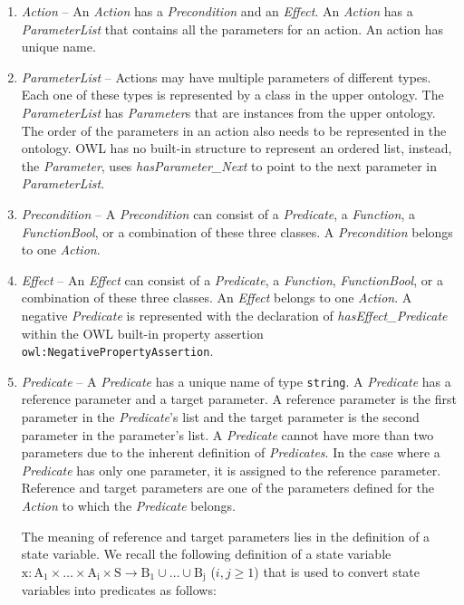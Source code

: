 \documentclass{llncs}
\newcommand{\class}[1] {\textit{#1}}
\begin{document}
\begin{enumerate}
\item \class{Action} -- An \class{Action} has a \class{Precondition} and an \class{Effect}. An \class{Action} has a \class{ParameterList} that contains all the parameters for an action. An action has unique name.
\item \class{ParameterList} -- Actions may have multiple parameters of different types. Each one of these types is represented by a class in the upper ontology. The \class{ParameterList} has \class{Parameter}s that are instances from the upper ontology. The order of the parameters in an  action also needs to be represented in the ontology. OWL has no built-in structure to represent an ordered list, instead, the \class{Parameter}, uses \emph{hasParameter\_Next} to point to the next parameter in \class{ParameterList}.
\item \class{Precondition} -- A \class{Precondition} can consist of a \class{Predicate}, a \class{Function}, a \class{FunctionBool}, or a combination of these three classes. A \class{Precondition} belongs to one \class{Action}.
\item \class{Effect} -- An \class{Effect} can consist of a \class{Predicate}, a \class{Function}, \class{FunctionBool}, or a combination of these three classes. An \class{Effect} belongs to one \class{Action}. A negative \class{Predicate} is represented with the declaration of \emph{hasEffect\_Predicate} within the OWL built-in property assertion \texttt{owl:NegativePropertyAssertion}.
\item \class{Predicate} -- A \class{Predicate} has a unique name  of type \texttt{string}. A \class{Predicate} has a reference parameter and a target parameter. A reference parameter is the first parameter in the \class{Predicate}'s list and the target parameter is the second parameter in the parameter's list. A \class{Predicate} cannot have more than two parameters due to the inherent definition of \class{Predicates}. In the case where a \class{Predicate} has only one parameter, it is assigned to the reference parameter. Reference and target parameters are one of the parameters defined for the \class{Action} to which the \class{Predicate} belongs.
    
    The meaning of reference and target parameters lies in the definition of a state variable. We recall the following definition of a state variable $\mathrm{x: A_1\times \dots\times A_i\times S\rightarrow B_1\cup\dots\cup B_j}$ ($i, j\geq 1$) that is used to convert state variables into predicates as follows:


\end{enumerate}
\end{document}
